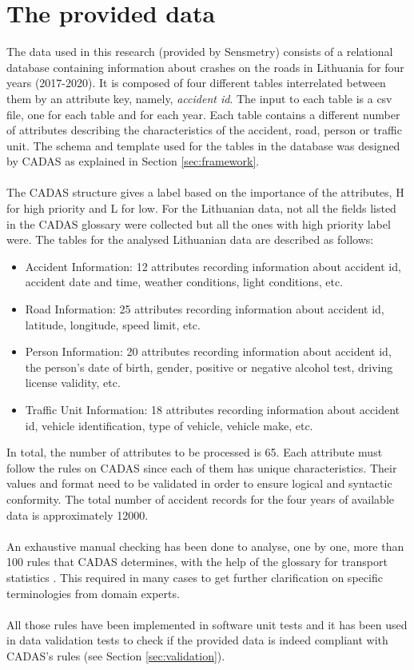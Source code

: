 \section{The provided data}
The data used in this research (provided by Sensmetry) consists of a relational database containing information about crashes on the roads in Lithuania for four years (2017-2020). It is composed of four different tables interrelated between them by an attribute key, namely, \textit{accident id}. The input to each table is a csv file, one for each table and for each year. Each table contains a different number of attributes describing the characteristics of the accident, road, person or traffic unit. The schema and template used for the tables in the database was designed by \ac{CADAS} as explained in Section \ref{sec:framework}.
\\
\\
The \ac{CADAS} structure gives a label based on the importance of the attributes, H for high priority and L for low. For the Lithuanian data, not all the fields listed in the \ac{CADAS} glossary were collected but all the ones with high priority label were. 
The tables for the analysed Lithuanian data are described as follows:
\begin{itemize}
    \item Accident Information: 12 attributes recording information about accident id, accident date and time, weather conditions, light conditions, etc. 
    \item Road Information: 25 attributes recording information about accident id, latitude, longitude, speed limit, etc.
    \item Person Information: 20 attributes recording information about accident id, the person's date of birth, gender, positive or negative alcohol test, driving license validity, etc.
    \item Traffic Unit Information: 18 attributes recording information about accident id, vehicle identification, type of vehicle, vehicle make, etc.
\end{itemize}

In total, the number of attributes to be processed is 65. Each attribute must follow the rules on \ac{CADAS} since each of them has unique characteristics. Their values and format need to be validated in order to ensure logical and syntactic conformity.  
The total number of accident records for the four years of available data is approximately 12000.
\\
\\
An exhaustive manual checking has been done to analyse, one by one, more than 100 rules that \ac{CADAS} determines, with the help of the glossary for transport statistics \cite{transport}. This required in many cases to get further clarification on specific terminologies from domain experts.
\\
\\
All those rules have been implemented in software unit tests and it has been used in data validation tests to check if the provided data is indeed compliant with \ac{CADAS}'s rules (see Section \ref{sec:validation}).
